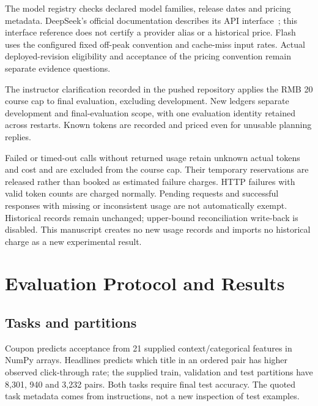 \documentclass[11pt,a4paper]{article}
\begin{document}
The model registry checks declared model families, release dates and pricing metadata. DeepSeek's official documentation describes its API interface~\cite{deepseek}; this interface reference does not certify a provider alias or a historical price. Flash uses the configured fixed off-peak convention and cache-miss input rates. Actual deployed-revision eligibility and acceptance of the pricing convention remain separate evidence questions.

The instructor clarification recorded in the pushed repository applies the RMB 20 course cap to final evaluation, excluding development. New ledgers separate development and final-evaluation scope, with one evaluation identity retained across restarts. Known tokens are recorded and priced even for unusable planning replies.

Failed or timed-out calls without returned usage retain unknown actual tokens and cost and are excluded from the course cap. Their temporary reservations are released rather than booked as estimated failure charges. HTTP failures with valid token counts are charged normally. Pending requests and successful responses with missing or inconsistent usage are not automatically exempt. Historical records remain unchanged; upper-bound reconciliation write-back is disabled. This manuscript creates no new usage records and imports no historical charge as a new experimental result.

\section{Evaluation Protocol and Results}
\subsection{Tasks and partitions}
Coupon predicts acceptance from 21 supplied context/categorical features in NumPy arrays. Headlines predicts which title in an ordered pair has higher observed click-through rate; the supplied train, validation and test partitions have 8,301, 940 and 3,232 pairs. Both tasks require final test accuracy. The quoted task metadata comes from instructions, not a new inspection of test examples.
\end{document}
